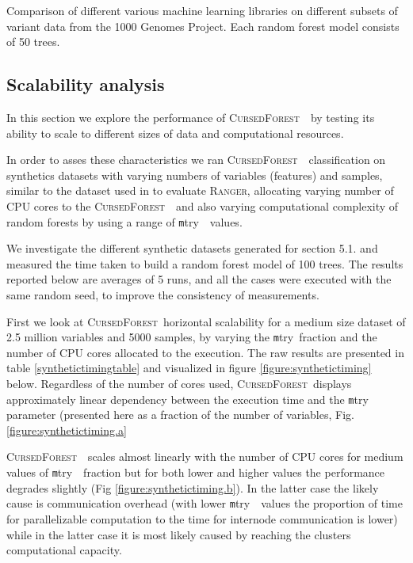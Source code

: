 \documentclass[10pt,letterpaper]{article}
\newcommand{\cursedforest}{\textsc{CursedForest}\ }
\newcommand{\mtry}{{\texttt mtry\ }}
\begin{document}
\begin{table}[!ht]
\begin{minipage}{\textwidth}
\begin{tabular}{| l | l | r | l |}
\end{tabular}
\begin{flushleft} 
Comparison of different various machine learning libraries on different subsets of variant data 
from the 1000 Genomes Project.
Each random forest model consists of 50 trees.
\end{flushleft}
\label{timingtable}
\end{minipage}
\end{table}

\subsection{Scalability analysis}
In this section we explore the performance of \cursedforest\ by testing its ability to scale to different sizes of data
and computational resources.

In order to asses these characteristics we ran \cursedforest\ classification on synthetics datasets with varying numbers
of variables (features) and samples, similar to the dataset used in \cite{Wright.and.Ziegle.2016} to evaluate
\textsc{Ranger}, allocating varying number of CPU cores to the \cursedforest\ and also varying computational complexity
of random forests by using a range of \mtry\ values.


We investigate the different synthetic datasets generated for section 5.1. and measured the time taken to build a random
forest model of 100 trees. The results reported below are averages of 5 runs, and all the cases were executed with the
same random seed, to improve the consistency of measurements.

First we look at \cursedforest horizontal scalability for a medium size dataset of 2.5 million variables and 5000
samples, by varying the \mtry  fraction and the number of CPU cores allocated to the execution. The raw results are
presented in table \ref{synthetictimingtable} and visualized in figure \ref{figure:synthetictiming} below. Regardless of the
number of cores used, \cursedforest displays approximately linear dependency between the execution time and the \mtry
parameter (presented here as a fraction of the number of variables, Fig. \ref{figure:synthetictiming.a}

\cursedforest\ scales almost linearly with the number of CPU cores for medium values of \mtry\ fraction but for both
lower and higher values the performance degrades slightly (Fig \ref{figure:synthetictiming.b}). In the latter case the likely cause is
communication overhead (with lower \mtry\ values the proportion of time for parallelizable computation to the time for
internode communication is lower) while in the latter case it is most likely caused by reaching the clusters
computational capacity.
\end{document}
